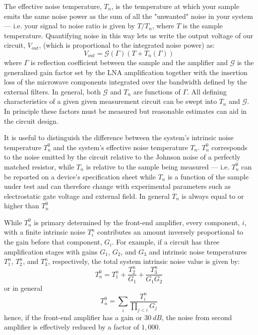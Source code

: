 The effective noise temperature, $T_n$, is the temperature at which your sample emits the same noise power as the sum of all the "unwanted" noise in your system --- i.e. your signal to noise ratio is given by $T/T_n$, where $T$ is the sample temperature. Quantifying noise in this way lets us write the output voltage of our circuit, $V_{out}$, (which is proportional to the integrated noise power) as:
\begin{equation}\label{eq:power_output}
V_{out} = \mathcal{G}(\Gamma)(T+T_n(\Gamma))
\end{equation}
where $\Gamma$ is reflection coefficient between the sample and the amplifier and $\mathcal{G}$ is the generalized gain factor set by the LNA amplification together with the insertion loss of the microwave components integrated over the bandwidth defined by the external filters. In general, both $\mathcal{G}$ and $T_n$ are functions of $\Gamma$. All defining characteristics of a given given measurement circuit can be swept into $T_n$ and $\mathcal{G}$. In principle these factors must be measured but reasonable estimates can aid in the circuit design.

It is useful to distinguish the difference between the system's intrinsic noise temperature $T_n^0$ and the system's effective noise temperature $T_n$. $T_n^0$ corresponds to the noise emitted by the circuit relative to the Johnson noise of a perfectly matched resistor, while $T_n$ is relative to the sample being measured --- i.e. $T_n^0$ can be reported on a device's specification sheet while $T_n$ is a function of the sample under test and can therefore change with experimental parameters such as electrostatic gate voltage and external field. In general $T_n$ is always equal to or higher than $T_n^0$

While $T_n^0$ is primary determined by the front-end amplifier, every component, $i$, with a finite intrinsic noise $T_i^n$ contributes an amount inversely proportional to the gain before that component, $G_i$. For example, if a circuit has three amplification stages with gains $G_1$, $G_2$, and $G_3$ and intrinsic noise temperatures $T_1^n$, $T_2^n$, and $T_3^n$, respectively, the total system intrinsic noise value is given by:
\begin{equation}
T_n^0 = T_1^n+\frac{T_2^n}{G_1}+\frac{T_3^n}{G_1G_2}
\end{equation}
or in general
\begin{equation}
T_n^0 = \sum_{i}\frac{T_i^n}{\prod_{j<i}G_j}
\end{equation}
hence, if the front-end amplifier has a gain or $30~dB$, the noise from second amplifier is effectively reduced by a factor of $1,000$.

